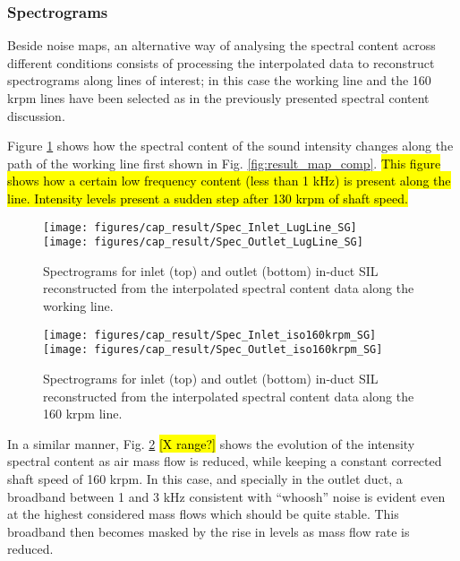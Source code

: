 \subsubsection{Spectrograms}

Beside noise maps, an alternative way of analysing the spectral content across different conditions consists of processing the interpolated data to reconstruct spectrograms along lines of interest; in this case the working line and the 160 krpm lines have been selected as in the previously presented spectral content discussion.

Figure \ref{fig:result_LugLine_SG} shows how the spectral content of the sound intensity changes along the path of the working line first shown in Fig. \ref{fig:result_map_comp}. \hl{This figure shows how a certain low frequency content (less than 1 kHz) is present along the line. Intensity levels present a sudden step after 130 krpm of shaft speed.}

\begin{figure}[tbh!]
\centering
\texttt{[image: figures/cap\_result/Spec\_Inlet\_LugLine\_SG]}\\[5mm]
\texttt{[image: figures/cap\_result/Spec\_Outlet\_LugLine\_SG]}
\caption{Spectrograms for inlet (top) and outlet (bottom) in-duct SIL reconstructed from the interpolated spectral content data along the working line.}
\label{fig:result_LugLine_SG}
\end{figure}

\begin{figure}[tbh!]
\centering
\texttt{[image: figures/cap\_result/Spec\_Inlet\_iso160krpm\_SG]}\\[5mm]
\texttt{[image: figures/cap\_result/Spec\_Outlet\_iso160krpm\_SG]}
\caption{Spectrograms for inlet (top) and outlet (bottom) in-duct SIL reconstructed from the interpolated spectral content data along the 160 krpm line.}
\label{fig:result_iso160krpm_SG}
\end{figure}

In a similar manner, Fig. \ref{fig:result_iso160krpm_SG} \hl{[X range?]} shows the evolution of the intensity spectral content as air mass flow is reduced, while keeping a constant corrected shaft speed of 160 krpm. In this case, and specially in the outlet duct, a broadband between 1 and 3 kHz consistent with ``whoosh'' noise is evident even at the highest considered mass flows which should be quite stable. This broadband then becomes masked by the rise in levels as mass flow rate is reduced.

